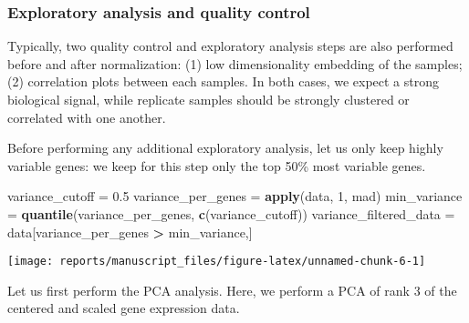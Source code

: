 \documentclass[9pt,a4paper,]{extarticle}
\newenvironment{Shaded}{\begin{snugshade}}{\end{snugshade}}
\newcommand{\CommentTok}[1]{\textcolor[rgb]{0.56,0.35,0.01}{\textit{#1}}}
\newcommand{\DecValTok}[1]{\textcolor[rgb]{0.00,0.00,0.81}{#1}}
\newcommand{\FloatTok}[1]{\textcolor[rgb]{0.00,0.00,0.81}{#1}}
\newcommand{\KeywordTok}[1]{\textcolor[rgb]{0.13,0.29,0.53}{\textbf{#1}}}
\newcommand{\NormalTok}[1]{#1}
\newcommand{\OperatorTok}[1]{\textcolor[rgb]{0.81,0.36,0.00}{\textbf{#1}}}
\newcommand{\StringTok}[1]{\textcolor[rgb]{0.31,0.60,0.02}{#1}}
\begin{document}
\begin{Shaded}
\end{Shaded}

\hypertarget{exploratory-analysis-and-quality-control}{%
\subsubsection{Exploratory analysis and quality control}\label{exploratory-analysis-and-quality-control}}

Typically, two quality control and exploratory analysis steps are also
performed before and after normalization: (1) low dimensionality embedding of
the samples; (2) correlation plots between each samples. In both cases, we
expect a strong biological signal, while replicate samples should be strongly
clustered or correlated with one another.

Before performing any additional exploratory analysis, let us only keep highly
variable genes: we keep for this step only the top 50\% most variable genes.

\begin{Shaded}
\begin{Highlighting}[]
\NormalTok{variance_cutoff =}\StringTok{ }\FloatTok{0.5}
\NormalTok{variance_per_genes =}\StringTok{ }\KeywordTok{apply}\NormalTok{(data, }\DecValTok{1}\NormalTok{, mad)}
\NormalTok{min_variance =}\StringTok{ }\KeywordTok{quantile}\NormalTok{(variance_per_genes, }\KeywordTok{c}\NormalTok{(variance_cutoff))}
\NormalTok{variance_filtered_data =}\StringTok{ }\NormalTok{data[variance_per_genes }\OperatorTok{>}\StringTok{ }\NormalTok{min_variance,]}
\end{Highlighting}
\end{Shaded}

\begin{center}\texttt{[image: reports/manuscript\_files/figure-latex/unnamed-chunk-6-1]} \end{center}

Let us first perform the PCA analysis. Here, we perform a PCA of rank 3 of the
centered and scaled gene expression data.
\end{document}
